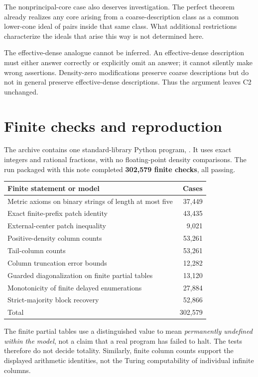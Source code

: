 \documentclass[11pt,a4paper]{article}
\theoremstyle{definition}\newtheorem{definition}[theorem]{Definition}
\theoremstyle{remark}\newtheorem{remark}[theorem]{Remark}
\begin{document}
The nonprincipal-core case also deserves investigation. The perfect theorem
already realizes any core arising from a coarse-description class as a
common lower-cone ideal of pairs inside that same class. What additional
restrictions characterize the ideals that arise this way is not determined
here.

The effective-dense analogue cannot be inferred. An effective-dense
description must either answer correctly or explicitly omit an answer; it
cannot silently make wrong assertions. Density-zero modifications preserve
coarse descriptions but do not in general preserve effective-dense
descriptions. Thus the argument leaves C2 unchanged.

\appendix
\section{Finite checks and reproduction}
\label{app:checks}
The archive contains one standard-library Python program,
. It uses exact integers and rational
fractions, with no floating-point density comparisons. The run packaged with
this note completed \textbf{302,579 finite checks}, all passing.

\begin{center}
\begin{tabular}{@{}lr@{}}
\toprule
Finite statement or model & Cases\\
\midrule
Metric axioms on binary strings of length at most five & 37,449\\
Exact finite-prefix patch identity & 43,435\\
External-center patch inequality & 9,021\\
Positive-density column counts & 53,261\\
Tail-column counts & 53,261\\
Column truncation error bounds & 12,282\\
Guarded diagonalization on finite partial tables & 13,120\\
Monotonicity of finite delayed enumerations & 27,884\\
Strict-majority block recovery & 52,866\\
\midrule
Total & 302,579\\
\bottomrule
\end{tabular}
\end{center}

The finite partial tables use a distinguished value to mean \emph{permanently
undefined within the model}, not a claim that a real program has failed to
halt. The tests therefore do not decide totality. Similarly, finite column
counts support the displayed arithmetic identities, not the Turing
computability of individual infinite columns.
\end{document}
